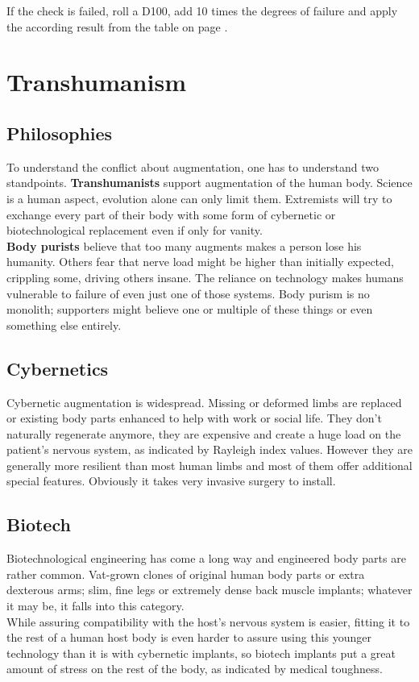 \documentclass[12pt,a4paper,openany]{book}
\begin{document}
	If the check is failed, roll a D100, add 10 times the degrees of failure and apply the according result from the table on page \pageref{feartable}.
	\chapter{Transhumanism}
	\section{Philosophies}
	To understand the conflict about augmentation, one has to understand two standpoints. \textbf{Transhumanists} support augmentation of the human body. Science is a human aspect, evolution alone can only limit them. Extremists will try to exchange every part of their body with some form of cybernetic or biotechnological replacement even if only for vanity.\\
	\textbf{Body purists} believe that too many augments makes a person lose his humanity. Others fear that nerve load might be higher than initially expected, crippling some, driving others insane. The reliance on technology makes humans vulnerable to failure of even just one of those systems. Body purism is no monolith; supporters might believe one or multiple of these things or even something else entirely.
	\section{Cybernetics}
	Cybernetic augmentation is widespread. Missing or deformed limbs are replaced or existing body parts enhanced to help with work or social life. They don’t naturally regenerate anymore, they are expensive and create a huge load on the patient’s nervous system, as indicated by Rayleigh index values. However they are generally more resilient than most human limbs and most of them offer additional special features. Obviously it takes very invasive surgery to install.
	\section{Biotech}
	Biotechnological engineering has come a long way and engineered body parts are rather common. Vat-grown clones of original human body parts or extra dexterous arms; slim, fine legs or extremely dense back muscle implants; whatever it may be, it falls into this category.\\
	While assuring compatibility with the host's nervous system is easier, fitting it to the rest of a human host body is even harder to assure using this younger technology than it is with cybernetic implants, so biotech implants put a great amount of stress on the rest of the body, as indicated by medical toughness.
\end{document}
